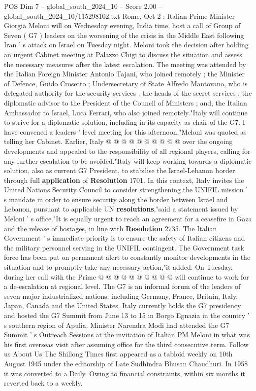 \begin{textsample}{POS Dim 7 – global\_south\_2024\_10 – Score 2.00 – global\_south\_2024\_10/115298102.txt}  \label{ex:f7_pos_208}
Rome, Oct 2 : Italian Prime Minister Giorgia Meloni will on Wednesday evening, India time, host a call of Group of Seven ( G7 ) leaders on the worsening of the crisis in the Middle East following Iran ' s attack on Israel on Tuesday night.
Meloni took the decision after holding an urgent Cabinet meeting at Palazzo Chigi to discuss the situation and assess the necessary measures after the latest escalation.
The meeting was attended by the Italian Foreign Minister Antonio Tajani, who joined remotely ; the Minister of Defence, Guido Crosetto ; Undersecretary of State Alfredo Mantovano, who is delegated authority for the security services ; the heads of the secret services ; the diplomatic advisor to the President of the Council of Ministers ; and, the Italian Ambassador to Israel, Luca Ferrari, who also joined remotely."Italy will continue to strive for a diplomatic solution, including in its capacity as chair of the G7.
I have convened a leaders ' level meeting for this afternoon,"Meloni was quoted as telling her Cabinet.
Earlier, Italy @ @ @ @ @ @ @ @ @ @ over the ongoing developments and appealed to the responsibility of all regional players, calling for any further escalation to be avoided."Italy will keep working towards a diplomatic solution, also as current G7 President, to stabilise the Israel-Lebanon border through full \textbf{application} of \textbf{Resolution} 1701.
In this context, Italy invites the United Nations Security Council to consider strengthening the UNIFIL mission ' s mandate in order to ensure security along the border between Israel and Lebanon, pursuant to applicable UN \textbf{resolutions},"said a statement issued by Meloni ' s office."It is equally urgent to reach an agreement for a ceasefire in Gaza and the release of hostages, in line with \textbf{Resolution} 2735.
The Italian Government ' s immediate priority is to ensure the safety of Italian citizens and the military personnel serving in the UNIFIL contingent.
The Government task force has been put on permanent alert to constantly monitor developments in the situation and to promptly take any necessary action,"it added.
On Tuesday, during her call with the Prime @ @ @ @ @ @ @ @ @ @ will continue to work for a de-escalation at regional level.
The G7 is an informal forum of the leaders of seven major industrialized nations, including Germany, France, Britain, Italy, Japan, Canada and the United States.
Italy currently holds the G7 presidency and hosted the G7 Summit from June 13 to 15 in Borgo Egnazia in the country ' s southern region of Apulia.
Minister Narendra Modi had attended the G7 Summit ' s Outreach Sessions at the invitation of Italian PM Meloni in what was his first overseas visit after assuming office for the third consecutive term.
Follow us About Us The Shillong Times first appeared as a tabloid weekly on 10th August 1945 under the editorship of Late Sudhindra Bhusan Chaudhuri.
In 1958 it was converted to a Daily.
Owing to financial constraints, within six months it reverted back to a weekly.

\end{textsample}
